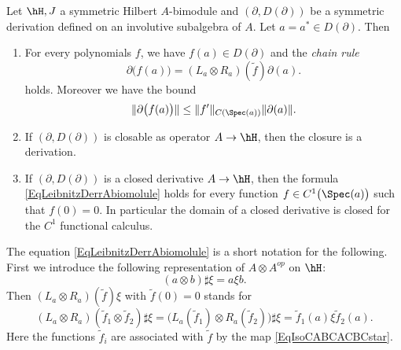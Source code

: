 \begin{lemma}
    Let \(\hH,J\) a symmetric Hilbert \(A\)-bimodule and \( (\partial,D(\partial))\) be a symmetric derivation defined on an involutive subalgebra of \(A\). Let \(a=a^*\in D(\partial)\). Then
    \begin{enumerate}
        \item
            For every polynomials \(f\), we have \(f(a)\in D(\partial)\) and the \emph{chain rule}
            \begin{equation}        \label{EqLeibnitzDerrAbiomolule}
                \partial\big( f(a) \big)=(L_a\otimes R_a)(\tilde f)\partial(a).
            \end{equation}
            holds. Moreover we have the bound
            \begin{equation}        \label{EqBoundpartialfanfpnpa}
                \| \partial\big( f(a) \big) \|\leq \| f' \|_{C(\Spec(a))}\| \partial(a) \|.
            \end{equation}
        \item
            If \( (\partial,D(\partial))\) is closable as operator \(A\to\hH\), then the closure is a derivation.
        \item
            If \( (\partial,D(\partial))\) is a closed derivative \(A\to\hH\), then the formula \eqref{EqLeibnitzDerrAbiomolule} holds for every function \(f\in C^1\big( \Spec(a) \big)\) such that \(f(0)=0\). In particular the domain of a closed derivative is closed for the \(C^1\) functional calculus.
    \end{enumerate}
    
\end{lemma}

\begin{remark}
    The equation \eqref{EqLeibnitzDerrAbiomolule} is a short notation for the following. First we introduce the following representation of \(A\otimes A^{op}\) on \(\hH\):
    \begin{equation}
        (a\otimes b)\sharp \xi=a\xi b.
    \end{equation}
    Then \(  (L_a\otimes R_a)(\tilde f)\xi \) with \(\tilde f(0)=0\) stands for
    \begin{equation}        \label{EqLaRattfsurxi}
        (L_a\otimes R_a)(\tilde f_1\otimes \tilde f_2 )\sharp\xi=\Big( L_a(\tilde f_1)\otimes R_a( \tilde f_2) \Big)\sharp\xi=\tilde f_1(a)\xi\tilde f_2(a).
    \end{equation}
    Here the functions \(\tilde f_i\) are associated with \(\tilde f\) by the map \eqref{EqIsoCABCACBCstar}.
\end{remark}

